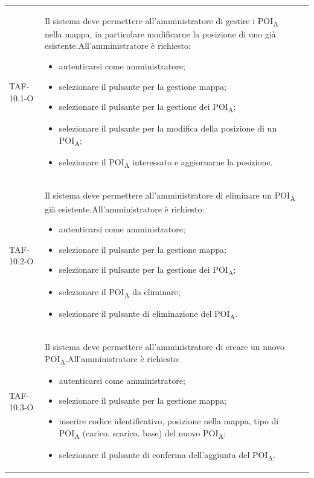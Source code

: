 \begin{longtable}{ >{\centering}p{} >{}p{}
		>{\centering}p{}}
	TAF-10.1-O & Il sistema deve permettere all'amministratore di gestire i \acrshort{POI}\textsubscript{A} nella mappa, in particolare modificarne la posizione di uno già esistente.\newline All'amministratore è richiesto: \begin{itemize}\item autenticarsi come amministratore; \item selezionare il pulsante per la gestione mappa; \item selezionare il pulsante per la gestione dei \acrshort{POI}\textsubscript{A}; \item selezionare il pulsante per la modifica della posizione di un \acrshort{POI}\textsubscript{A}; \item selezionare il \acrshort{POI}\textsubscript{A} interessato e aggiornarne la posizione.\end{itemize} & 0\tabularnewline

	TAF-10.2-O & Il sistema deve permettere all'amministratore di eliminare un \acrshort{POI}\textsubscript{A} già esistente.\newline All'amministratore è richiesto: \begin{itemize}\item autenticarsi come amministratore; \item selezionare il pulsante per la gestione mappa; \item selezionare il pulsante per la gestione dei \acrshort{POI}\textsubscript{A}; \item selezionare il \acrshort{POI}\textsubscript{A} da eliminare; \item selezionare il pulsante di eliminazione del \acrshort{POI}\textsubscript{A}.\end{itemize} & 0\tabularnewline

	TAF-10.3-O & Il sistema deve permettere all'amministratore di creare un nuovo \acrshort{POI}\textsubscript{A}.\newline All'amministratore è richiesto: \begin{itemize}\item autenticarsi come amministratore; \item selezionare il pulsante per la gestione mappa; \item inserire codice identificativo, posizione nella mappa, tipo di \acrshort{POI}\textsubscript{A} (carico, scarico, base) del nuovo \acrshort{POI}\textsubscript{A}; \item selezionare il pulsante di conferma dell'aggiunta del \acrshort{POI}\textsubscript{A}.\end{itemize} & 0\tabularnewline


\end{longtable}
